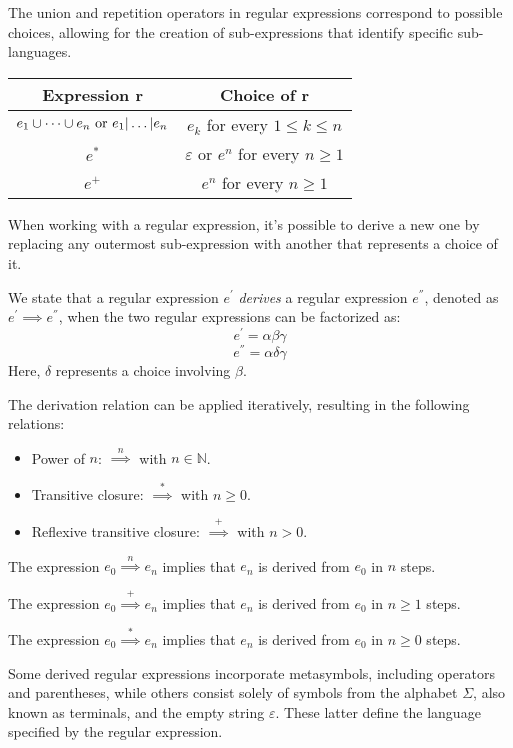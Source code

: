 The union and repetition operators in regular expressions correspond to possible choices, allowing for the creation of sub-expressions that identify specific sub-languages.
\begin{table}[H]
    \centering
    \begin{tabular}{cc}
    \hline
    \textbf{Expression $\boldsymbol{r}$}                                    & \textbf{Choice of $\boldsymbol{r}$}                       \\ \hline
    $e_1 \cup \dots \cup e_n \textnormal{ or } e_1 | \dots | e_n$           & $e_k$ for every $1 \leq k \leq n$                         \\
    $e^{*}$                                                                 & $\varepsilon$ or $e^n$ for every $n \geq 1$               \\
    $e^{+}$                                                                 & $e^n$ for every $n \geq 1$                                \\ \hline
    \end{tabular}
\end{table}
When working with a regular expression, it's possible to derive a new one by replacing any outermost sub-expression with another that represents a choice of it.
\newpage
\begin{definition}
    We state that a regular expression $e^{'}$ \emph{derives} a regular expression $e^{''}$, denoted as $e^{'} \implies e^{''}$, when the two regular expressions can be factorized as:
    \[e^{'}=\alpha \beta \gamma\]
    \[e^{''}=\alpha \delta \gamma\]
    Here, $\delta$ represents a choice involving $\beta$.
\end{definition}
The derivation relation can be applied iteratively, resulting in the following relations:
\begin{itemize}
    \item Power of $n$: $\overset{n}{\implies}$ with $n \in \mathbb{N}$. 
    \item Transitive closure: $\overset{*}{\implies}$ with $n \geq 0$. 
    \item Reflexive transitive closure: $\overset{+}{\implies}$ with $n > 0$.
\end{itemize}
\begin{example}
    The expression $e_0 \overset{n}{\implies} e_n$ implies that $e_n$ is derived from $e_0$ in $n$ steps. 

    The expression $e_0 \overset{+}{\implies} e_n$ implies that $e_n$ is derived from $e_0$ in $n \geq 1$ steps. 

    The expression $e_0 \overset{*}{\implies} e_n$ implies that $e_n$ is derived from $e_0$ in $n \geq 0$ steps. 
\end{example}
Some derived regular expressions incorporate metasymbols, including operators and parentheses, while others consist solely of symbols from the alphabet $\Sigma$, also known as terminals, and the empty string $\varepsilon$. 
These latter define the language specified by the regular expression.

